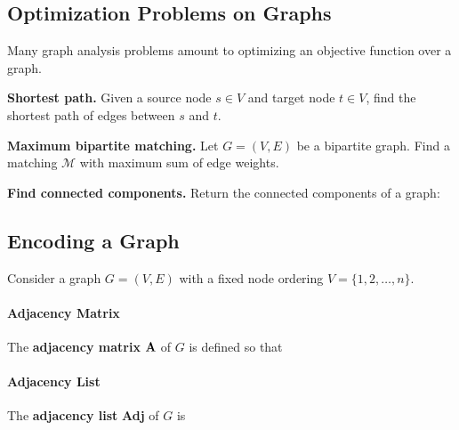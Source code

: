 \documentclass[11  pt]{exam}
\begin{document}
	\subsection{Optimization Problems on Graphs}
	Many graph analysis problems amount to optimizing an objective function over a graph.
	
	\begin{example}\textbf{Shortest path.}
		Given a source node $s \in V$ and target node $t \in V$, find the shortest path of edges between $s$ and $t$. 
	\end{example}
	
	\vspace{5cm}
	
	\begin{example}\textbf{Maximum bipartite matching.}
		Let $G = (V,E)$ be a bipartite graph. Find a matching $\mathcal{M}$ with maximum sum of edge weights.
	\end{example}
	
	
	
	\vspace{5cm}
	
	\begin{example}\textbf{Find connected components.}
		Return the connected components of a graph:
		
	\end{example}
	
	\newpage
	\subsection{Encoding a Graph}
	Consider a graph $G = (V,E)$ with a fixed node ordering $V = \{1, 2, \hdots , n\}$.
	
	\paragraph{Adjacency Matrix}
	The \textbf{adjacency matrix} $\textbf{A}$ of $G$ is defined so that
	
	\vspace{7cm}
	
	\paragraph{Adjacency List}
	The \textbf{adjacency list} \textbf{Adj} of $G$ is 
	
\end{document}
